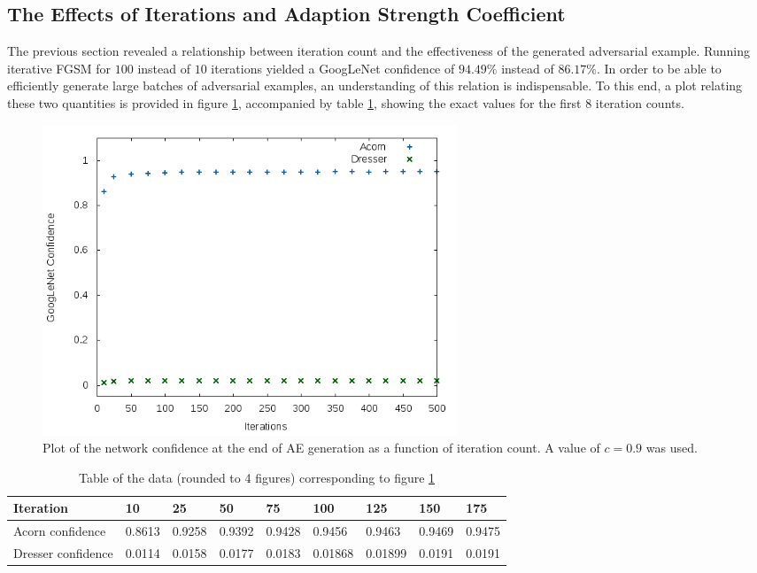\documentclass[11pt, a4paper]{article}
\begin{document}
\subsection{The Effects of Iterations and Adaption Strength Coefficient}
The previous section revealed a relationship between iteration count and the effectiveness of the generated adversarial example. Running iterative FGSM for $100$ instead of $10$ iterations yielded a GoogLeNet confidence of $94.49\%$ instead of $86.17\%$. In order to be able to efficiently generate large batches of adversarial examples, an understanding of this relation is indispensable. To this end, a plot relating these two quantities is provided in figure \ref{fig:confidence-vs-iterations}, accompanied by table \ref{tab:confidence-vs-iterations}, showing the exact values for the first 8 iteration counts.

\begin{figure}[h!tb]
	\centering
	\includegraphics[width=0.6\textwidth]{images/confidence-vs-iterations.png}
	\caption[Final network confidence w.r.t used iterations]{Plot of the network confidence at the end of AE generation as a function of iteration count. A value of $c = 0.9$ was used.}
	\label{fig:confidence-vs-iterations}
\end{figure}

\begin{table}[h!tb]
	\begin{tabular}{|l|llllllll|}
		\hline
		Iteration & 10 & 25 & 50 & 75 & 100 & 125 & 150 & 175 \\
		\hline
		Acorn confidence & 0.8613 & 0.9258 & 0.9392 & 0.9428 & 0.9456 & 0.9463 & 0.9469 & 0.9475 \\
		Dresser confidence & 0.0114 & 0.0158 & 0.0177 & 0.0183 & 0.01868 & 0.01899 & 0.0191 & 0.0191 \\
		\hline
	\end{tabular}
	\caption[Final network confidence w.r.t iterations]{Table of the data (rounded to 4 figures) corresponding to figure \ref{fig:confidence-vs-iterations}}
	\label{tab:confidence-vs-iterations}
\end{table}
\end{document}
